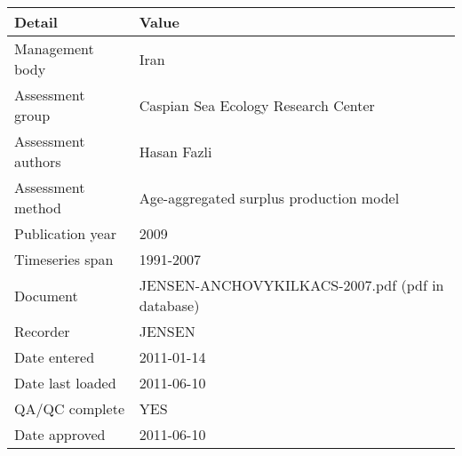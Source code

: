 \begin{table}[htb]
\centering
\begin{tabular}{lp{7cm}}
\toprule
Detail & Value \\
\midrule
Management body    & Iran                                             \\
Assessment group   & Caspian Sea Ecology Research Center              \\
Assessment authors & Hasan Fazli                                      \\
Assessment method  & Age-aggregated surplus production model          \\
Publication year   & 2009                                             \\
Timeseries span    & 1991-2007                                        \\
Document           & JENSEN-ANCHOVYKILKACS-2007.pdf (pdf in database) \\
Recorder           & JENSEN                                           \\
Date entered       & 2011-01-14                                       \\
Date last loaded   & 2011-06-10                                       \\
QA/QC complete     & YES                                              \\
Date approved      & 2011-06-10                                       \\
\bottomrule
\end{tabular}
\label{tab:assessdet}
\end{table}
